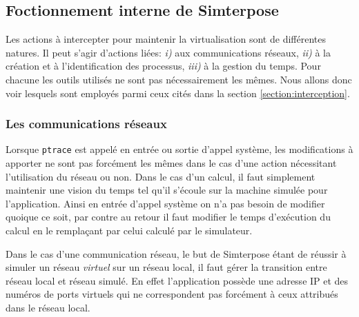 \subsection{Foctionnement interne de Simterpose}
Les actions à intercepter pour maintenir la virtualisation sont de différentes
natures. Il peut s'agir d'actions liées: \textit{i)} aux communications réseaux,
\textit{ii)} à la création et à l'identification des processus, \textit{iii)} à
la gestion du temps. Pour chacune les outils utilisés ne sont pas nécessairement
les mêmes. Nous allons donc voir lesquels sont employés parmi ceux cités dans la
section \ref{section:interception}.

\subsubsection{Les communications réseaux}

Lorsque \texttt{ptrace} est appelé en entrée ou sortie d'appel système, les
modifications à apporter ne sont pas forcément les mêmes dans le cas d'une
action nécessitant l'utilisation du réseau ou non. Dans le cas d'un calcul, il
faut simplement maintenir une vision du temps tel qu'il s'écoule sur la machine
simulée pour l'application. Ainsi en entrée d'appel système on n'a pas besoin de
modifier quoique ce soit, par contre au retour il faut modifier le temps
d'exécution du calcul en le remplaçant par celui calculé par le simulateur.

Dans le cas d'une communication réseau, le but de Simterpose étant de réussir à
simuler un réseau \textit{virtuel} sur un réseau local, il faut gérer la
transition entre réseau local et réseau simulé. En effet l'application possède
une adresse IP et des numéros de ports virtuels qui ne correspondent pas
forcément à ceux attribués dans le réseau local.

